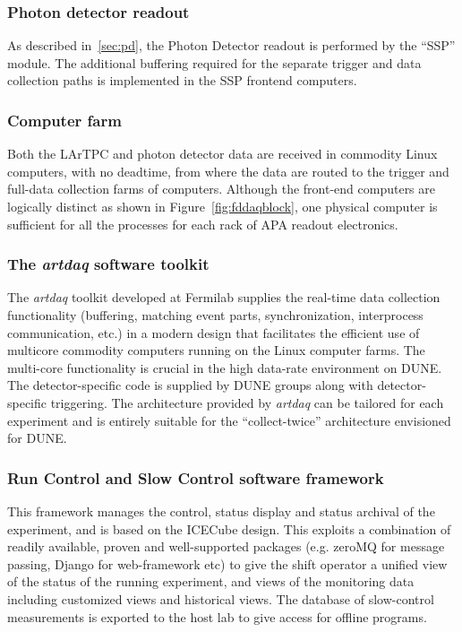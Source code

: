 \subsubsection{Photon detector readout}

As described in~\ref{sec:pd}, the Photon Detector readout  is performed by the ``SSP'' module.
 The additional buffering required for the separate trigger and data collection paths
is implemented in the SSP frontend computers.

\subsubsection{Computer farm}
Both the LArTPC and photon detector data are
received in commodity Linux computers, with no deadtime, from where
the data are routed to the trigger and full-data collection farms of
computers.  Although the front-end computers are logically distinct as
shown in Figure~\ref{fig:fddaqblock}, one physical computer is
sufficient for all the processes for each rack of APA readout
electronics. 

\subsubsection{The \textit{artdaq} software toolkit}

The \textit{artdaq} toolkit developed at  Fermilab supplies the real-time
data collection functionality (buffering, matching event parts,
synchronization, interprocess communication, etc.) in a modern
design that facilitates the efficient use of multicore commodity
computers running on the Linux computer farms.  The multi-core
functionality is crucial in the high data-rate environment on DUNE.  
The detector-specific code is supplied by DUNE groups
along with detector-specific triggering.
The architecture
provided by \textit{artdaq} can be tailored for each experiment and is entirely
suitable for the ``collect-twice'' architecture envisioned for DUNE.

\subsubsection{Run Control and Slow Control software framework}

This framework manages the control, status display and status archival of the experiment,
and is based on the ICECube design.  This exploits a combination of readily available, proven and
well-supported packages (e.g. zeroMQ for message passing, Django for web-framework etc) 
to give the shift operator a unified view of the status
of the running experiment, and views of the monitoring data including
customized views and historical views.  The database of slow-control
measurements is exported to the host lab to give access for offline
programs.

